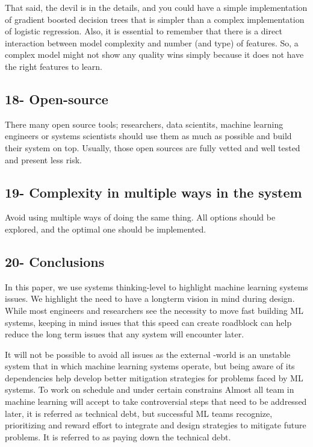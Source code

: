 \documentclass[]{article}
\begin{document}
That said, the devil is in the details, and you could have a simple
implementation of gradient boosted decision trees that is simpler than a
complex implementation of logistic regression. Also, it is essential to
remember that there is a direct interaction between model complexity and
number (and type) of features. So, a complex model might not show any
quality wins simply because it does not have the right features to
learn.

\subsection{18- Open-source}\label{open-source}

There many open source tools; researchers, data scientits, machine
learning engineers or systems scientists should use them as much as
possible and build their system on top. Usually, those open sources are
fully vetted and well tested and present less risk.

\subsection{19- Complexity in multiple ways in the
system}\label{complexity-in-multiple-ways-in-the-system}

Avoid using multiple ways of doing the same thing. All options should be
explored, and the optimal one should be implemented.

\subsection{20- Conclusions}\label{conclusions}

In this paper, we use systems thinking-level to highlight machine
learning systems issues. We highlight the need to have a longterm vision
in mind during design. While most engineers and researchers see the
necessity to move fast building ML systems, keeping in mind issues that
this speed can create roadblock can help reduce the long term issues
that any system will encounter later.

It will not be possible to avoid all issues as the external -world is an
unstable system that in which machine learning systems operate, but
being aware of its dependencies help develop better mitigation
strategies for problems faced by ML systems. To work on schedule and
under certain constrains Almost all team in machine learning will accept
to take controversial steps that need to be addressed later, it is
referred as technical debt, but successful ML teams recognize,
prioritizing and reward effort to integrate and design strategies to
mitigate future problems. It is referred to as paying down the technical
debt.
\end{document}
